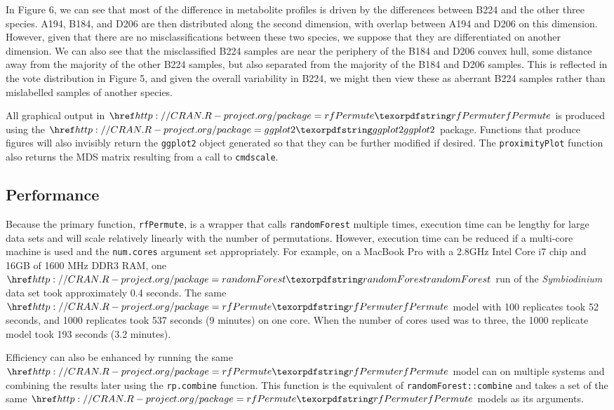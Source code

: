 In Figure 6, we can see that most of the difference in metabolite
profiles is driven by the differences between B224 and the other three
species. A194, B184, and D206 are then distributed along the second
dimension, with overlap between A194 and D206 on this dimension.
However, given that there are no misclassifications between these two
species, we suppose that they are differentiated on another dimension.
We can also see that the misclassified B224 samples are near the
periphery of the B184 and D206 convex hull, some distance away from the
majority of the other B224 samples, but also separated from the majority
of the B184 and D206 samples. This is reflected in the vote distribution
in Figure 5, and given the overall variability in B224, we might then
view these as aberrant B224 samples rather than mislabelled samples of
another species.

All graphical output in \(\CRANpkg{rfPermute}\) is produced using the
\(\CRANpkg{ggplot2}\) package. Functions that produce figures will also
invisibly return the \texttt{ggplot2} object generated so that they can
be further modified if desired. The \texttt{proximityPlot} function also
returns the MDS matrix resulting from a call to \texttt{cmdscale}.

\subsection{Performance}\label{performance}

Because the primary function, \texttt{rfPermute}, is a wrapper that
calls \texttt{randomForest} multiple times, execution time can be
lengthy for large data sets and will scale relatively linearly with the
number of permutations. However, execution time can be reduced if a
multi-core machine is used and the \texttt{num.cores} argument set
appropriately. For example, on a MacBook Pro with a 2.8GHz Intel Core i7
chip and 16GB of 1600 MHz DDR3 RAM, one \(\CRANpkg{randomForest}\) run
of the \emph{Symbiodinium} data set took approximately 0.4 seconds. The
same \(\CRANpkg{rfPermute}\) model with 100 replicates took 52 seconds,
and 1000 replicates took 537 seconds (9 minutes) on one core. When the
number of cores used was to three, the 1000 replicate model took 193
seconds (3.2 minutes).

Efficiency can also be enhanced by running the same
\(\CRANpkg{rfPermute}\) model can on multiple systems and combining the
results later using the \texttt{rp.combine} function. This function is
the equivalent of \texttt{randomForest::combine} and takes a set of the
same \(\CRANpkg{rfPermute}\) models as its arguments.

